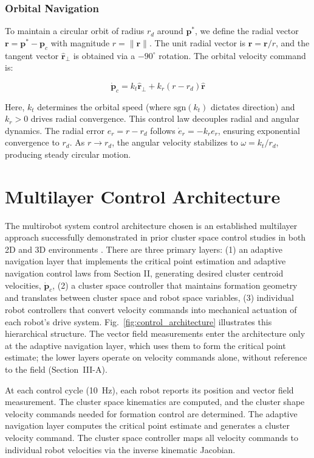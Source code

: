 \documentclass[lettersize,journal]{IEEEtran}
\begin{document}
\subsubsection{Orbital Navigation}
To maintain a circular orbit of radius $r_d$ around $\mathbf{p}^*$, we define the radial vector $\mathbf{r} = \mathbf{p}^* - \mathbf{p}_c$ with magnitude $r = \|\mathbf{r}\|$. The unit radial vector is $\hat{\mathbf{r}} = \mathbf{r}/r$, and the tangent vector $\hat{\mathbf{r}}_\perp$ is obtained via a $-90^\circ$ rotation. The orbital velocity command is:

\begin{equation}\label{eq:11}
\dot{\mathbf{p}}_c = k_t \hat{\mathbf{r}}_\perp + k_r(r - r_d)\hat{\mathbf{r}}
\end{equation}

Here, $k_t$ determines the orbital speed (where $\text{sgn}(k_t)$ dictates direction) and $k_r > 0$ drives radial convergence.
This control law decouples radial and angular dynamics. The radial error $e_r = r - r_d$ follows $\dot{e}_r = -k_r e_r$, ensuring exponential convergence to $r_d$. As $r \to r_d$, the angular velocity stabilizes to $\omega = k_t/r_d$, producing steady circular motion.

\section{Multilayer Control Architecture}


The multirobot system control architecture chosen is an established multilayer approach successfully demonstrated in prior cluster space control studies in both 2D and 3D environments \cite{5,8}. There are three primary layers: (1) an adaptive navigation layer that implements the critical point estimation and adaptive navigation control laws from Section II, generating desired cluster centroid velocities, $\dot{\mathbf{p}}_c$, (2) a cluster space controller that maintains formation geometry and translates between cluster space and robot space variables, (3) individual robot controllers that convert velocity commands into mechanical actuation of each robot's drive system. Fig.~\ref{fig:control_architecture} illustrates this hierarchical structure. The vector field measurements enter the architecture only at the adaptive navigation layer, which uses them to form the critical point estimate; the lower layers operate on velocity commands alone, without reference to the field (Section~III-A).

At each control cycle (10~Hz), each robot reports its position and vector field measurement. The cluster space kinematics are computed, and the cluster shape velocity commands needed for formation control are determined. The adaptive navigation layer computes the critical point estimate and generates a cluster velocity command. The cluster space controller maps all velocity commands to individual robot velocities via the inverse kinematic Jacobian.
\end{document}
